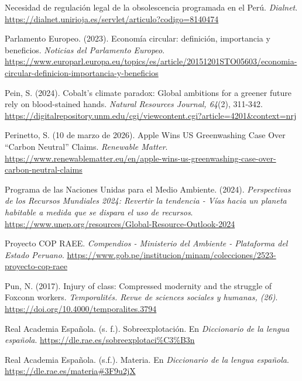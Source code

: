 \documentclass[stu,12pt,a4paper]{apa7}
\begin{document}
\begin{list}{}{
    \setlength{\leftmargin}{1.27cm}
    \setlength{\itemindent}{-1.27cm}  
    \setlength{\parsep}{0pt}       
    \setlength{\itemsep}{0.8em}      
}
\item Necesidad de regulación legal de la obsolescencia programada en el Perú. \textit{Dialnet}. \url{https://dialnet.unirioja.es/servlet/articulo?codigo=8140474}

\item Parlamento Europeo. (2023). Economía circular: definición, importancia y beneficios. \textit{Noticias del Parlamento Europeo}. \url{https://www.europarl.europa.eu/topics/es/article/20151201STO05603/economia-circular-definicion-importancia-y-beneficios}

\item Pein, S. (2024). Cobalt’s climate paradox: Global ambitions for a greener future rely on blood-stained hands. \textit{Natural Resources Journal, 64}(2), 311-342. \url{https://digitalrepository.unm.edu/cgi/viewcontent.cgi?article=4201&context=nrj}

\item Perinetto, S. (10 de marzo de 2026). Apple Wins US Greenwashing Case Over “Carbon Neutral” Claims. \textit{Renewable Matter}. \url{https://www.renewablematter.eu/en/apple-wins-us-greenwashing-case-over-carbon-neutral-claims}

\item Programa de las Naciones Unidas para el Medio Ambiente. (2024). \textit{Perspectivas de los Recursos Mundiales 2024: Revertir la tendencia - Vías hacia un planeta habitable a medida que se dispara el uso de recursos}. \url{https://www.unep.org/resources/Global-Resource-Outlook-2024}

\item Proyecto COP RAEE. \textit{Compendios - Ministerio del Ambiente - Plataforma del Estado Peruano}. \url{https://www.gob.pe/institucion/minam/colecciones/2523-proyecto-cop-raee}

\item Pun, N. (2017). Injury of class: Compressed modernity and the struggle of Foxconn workers. \textit{Temporalités. Revue de sciences sociales y humanas, (26)}. \url{https://doi.org/10.4000/temporalites.3794}

\item Real Academia Española. (s. f.). Sobreexplotación. En \textit{Diccionario de la lengua española}. \url{https://dle.rae.es/sobreexplotaci%C3%B3n}

\item Real Academia Española. (s.f.). Materia. En \textit{Diccionario de la lengua española}. \url{https://dle.rae.es/materia#3F9u2jX}


\end{list}
\end{document}
